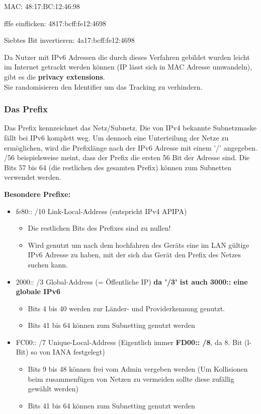 \documentclass[10pt]{article}
\begin{document}
MAC: 48:17:BC:12:46:98

fffe einflicken: 4817:bcff:fe12:4698

Siebtes Bit invertieren: 4a17:bcff:fe12:4698

Da Nutzer mit IPv6 Adressen die durch dieses Verfahren gebildet wurden leicht im Internet getrackt werden können (IP lässt sich in MAC Adresse umwandeln), gibt es die \textbf{privacy extensions}.\\
Sie randomisieren den Identifier um das Tracking zu verhindern.

\subsubsection{Das Prefix}

Das Prefix kennzeichnet das Netz/Subnetz. Die von IPv4 bekannte Subnetzmaske fällt bei IPv6 komplett weg. Um dennoch eine Unterteilung der Netze zu ermöglichen, wird die Prefixlänge nach der IPv6 Adresse mit einem '/' angegeben. /56 beispielsweise meint, dass der Prefix die ersten 56 Bit der Adresse sind. Die Bits 57 bis 64 (die restlichen des gesamten Prefix) können zum Subnetten verwendet werden.

\textbf{Besondere Prefixe:}
\begin{itemize}
    \item fe80:: /10 \textrightarrow\space Link-Local-Address (entspricht IPv4 APIPA)\\
        \begin{itemize}
            \item Die restlichen Bits des Prefixes sind zu nullen!
            \item Wird genutzt um nach dem hochfahren des Geräts eine im LAN gültige IPv6 Adresse zu haben, mit der sich das Gerät den Prefix des Netzes suchen kann.
        \end{itemize}
    \item 2000:: /3 \textrightarrow\space Global-Address (= Öffentliche IP) \textbf{da '/3' ist auch 3000:: eine globale IPv6}
        \begin{itemize}
            \item Bits 4 bis 40 werden zur Länder- und Providerkennung genutzt.
            \item Bits 41 bis 64 können zum Subnetting genutzt werden
        \end{itemize}
    \item FC00:: /7 \textrightarrow\space Unique-Local-Address (Eigentlich immer \textbf{FD00:: /8}, da 8. Bit (l-Bit) so von IANA festgelegt)
       \begin{itemize}
           \item Bits 9 bis 48 können frei vom Admin vergeben werden (Um Kollisionen beim zusammenfügen von Netzen zu vermeiden sollte diese zufällig gewählt werden)
           \item Bits 41 bis 64 können zum Subnetting genutzt werden
       \end{itemize}
\end{itemize}
\end{document}
